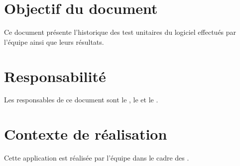 
\section*{Objectif du document}
	Ce document présente l'historique des test unitaires du logiciel effectués par l'équipe \nomEquipe{} ainsi que leurs résultats.	
	
\section*{Responsabilité}
	Les responsables de ce document sont le \CP, le \RQ{} et le \RD.
	
\section*{Contexte de réalisation}
	Cette application est réalisée par l'équipe \nomEquipe{} dans le cadre des \PIC.

